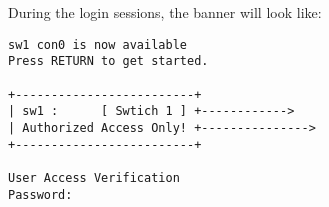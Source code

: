 \noindent
During the login sessions, the banner will look like: 

\vspace{-15pt}
\begin{verbatim}
sw1 con0 is now available
Press RETURN to get started.

+-------------------------+
| sw1 :      [ Swtich 1 ] +------------>
| Authorized Access Only! +--------------->
+-------------------------+

User Access Verification
Password:
\end{verbatim}
\vspace{-10pt}
